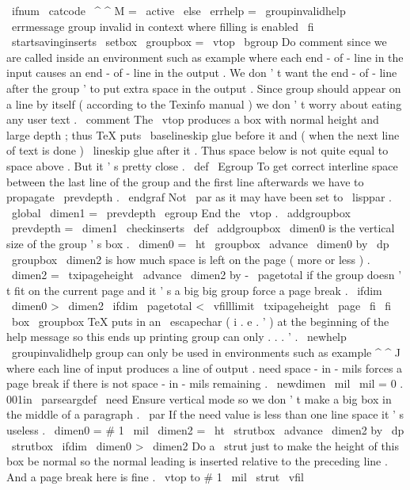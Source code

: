 {{\
ifnum
\
catcode
\
^
^
M
=
\
active
\
else
\
errhelp
=
\
groupinvalidhelp
\
errmessage
{
group
invalid
in
context
where
filling
is
enabled
}
%
\
fi
\
startsavinginserts
%
\
setbox
\
groupbox
=
\
vtop
\
bgroup
%
Do
comment
since
we
are
called
inside
an
environment
such
as
%
example
where
each
end
-
of
-
line
in
the
input
causes
an
%
end
-
of
-
line
in
the
output
.
We
don
'
t
want
the
end
-
of
-
line
after
%
the
group
'
to
put
extra
space
in
the
output
.
Since
group
%
should
appear
on
a
line
by
itself
(
according
to
the
Texinfo
%
manual
)
we
don
'
t
worry
about
eating
any
user
text
.
\
comment
}
%
%
The
\
vtop
produces
a
box
with
normal
height
and
large
depth
;
thus
TeX
puts
%
\
baselineskip
glue
before
it
and
(
when
the
next
line
of
text
is
done
)
%
\
lineskip
glue
after
it
.
Thus
space
below
is
not
quite
equal
to
space
%
above
.
But
it
'
s
pretty
close
.
\
def
\
Egroup
{
%
%
To
get
correct
interline
space
between
the
last
line
of
the
group
%
and
the
first
line
afterwards
we
have
to
propagate
\
prevdepth
.
\
endgraf
%
Not
\
par
as
it
may
have
been
set
to
\
lisppar
.
\
global
\
dimen1
=
\
prevdepth
\
egroup
%
End
the
\
vtop
.
\
addgroupbox
\
prevdepth
=
\
dimen1
\
checkinserts
}
\
def
\
addgroupbox
{
%
\
dimen0
is
the
vertical
size
of
the
group
'
s
box
.
\
dimen0
=
\
ht
\
groupbox
\
advance
\
dimen0
by
\
dp
\
groupbox
%
\
dimen2
is
how
much
space
is
left
on
the
page
(
more
or
less
)
.
\
dimen2
=
\
txipageheight
\
advance
\
dimen2
by
-
\
pagetotal
%
if
the
group
doesn
'
t
fit
on
the
current
page
and
it
'
s
a
big
big
%
group
force
a
page
break
.
\
ifdim
\
dimen0
>
\
dimen2
\
ifdim
\
pagetotal
<
\
vfilllimit
\
txipageheight
\
page
\
fi
\
fi
\
box
\
groupbox
}
%
%
TeX
puts
in
an
\
escapechar
(
i
.
e
.
'
)
at
the
beginning
of
the
help
%
message
so
this
ends
up
printing
group
can
only
.
.
.
'
.
%
\
newhelp
\
groupinvalidhelp
{
%
group
can
only
be
used
in
environments
such
as
example
^
^
J
%
where
each
line
of
input
produces
a
line
of
output
.
}
%
need
space
-
in
-
mils
%
forces
a
page
break
if
there
is
not
space
-
in
-
mils
remaining
.
\
newdimen
\
mil
\
mil
=
0
.
001in
\
parseargdef
\
need
{
%
%
Ensure
vertical
mode
so
we
don
'
t
make
a
big
box
in
the
middle
of
a
%
paragraph
.
\
par
%
%
If
the
need
value
is
less
than
one
line
space
it
'
s
useless
.
\
dimen0
=
#
1
\
mil
\
dimen2
=
\
ht
\
strutbox
\
advance
\
dimen2
by
\
dp
\
strutbox
\
ifdim
\
dimen0
>
\
dimen2
%
%
Do
a
\
strut
just
to
make
the
height
of
this
box
be
normal
so
the
%
normal
leading
is
inserted
relative
to
the
preceding
line
.
%
And
a
page
break
here
is
fine
.
\
vtop
to
#
1
\
mil
{
\
strut
\
vfil
}}}
